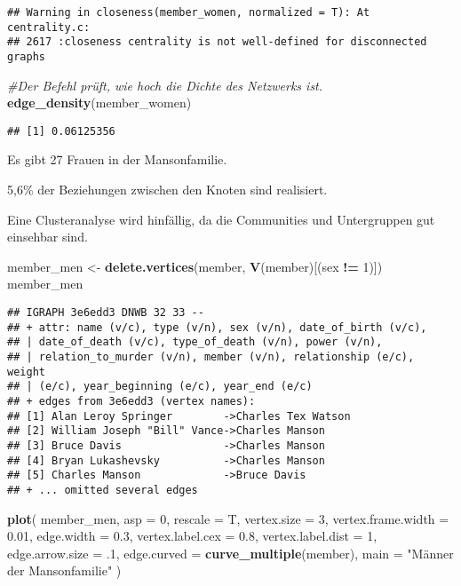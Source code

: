 \documentclass[
]{article}
\newenvironment{Shaded}{\begin{snugshade}}{\end{snugshade}}
\newcommand{\CommentTok}[1]{\textcolor[rgb]{0.56,0.35,0.01}{\textit{#1}}}
\newcommand{\DataTypeTok}[1]{\textcolor[rgb]{0.13,0.29,0.53}{#1}}
\newcommand{\DecValTok}[1]{\textcolor[rgb]{0.00,0.00,0.81}{#1}}
\newcommand{\FloatTok}[1]{\textcolor[rgb]{0.00,0.00,0.81}{#1}}
\newcommand{\KeywordTok}[1]{\textcolor[rgb]{0.13,0.29,0.53}{\textbf{#1}}}
\newcommand{\NormalTok}[1]{#1}
\newcommand{\OperatorTok}[1]{\textcolor[rgb]{0.81,0.36,0.00}{\textbf{#1}}}
\newcommand{\StringTok}[1]{\textcolor[rgb]{0.31,0.60,0.02}{#1}}
\begin{document}
\begin{verbatim}
## Warning in closeness(member_women, normalized = T): At centrality.c:
## 2617 :closeness centrality is not well-defined for disconnected graphs
\end{verbatim}

\begin{Shaded}
\begin{Highlighting}[]
\CommentTok{#Der Befehl prüft, wie hoch die Dichte des Netzwerks ist.}
\KeywordTok{edge_density}\NormalTok{(member_women)}
\end{Highlighting}
\end{Shaded}

\begin{verbatim}
## [1] 0.06125356
\end{verbatim}

Es gibt 27 Frauen in der Mansonfamilie.

5,6\% der Beziehungen zwischen den Knoten sind realisiert.

Eine Clusteranalyse wird hinfällig, da die Communities und Untergruppen
gut einsehbar sind.

\begin{Shaded}
\begin{Highlighting}[]
\NormalTok{member_men <-}\StringTok{ }\KeywordTok{delete.vertices}\NormalTok{(member, }\KeywordTok{V}\NormalTok{(member)[(sex }\OperatorTok{!=}\StringTok{ }\DecValTok{1}\NormalTok{)])}
\NormalTok{member_men}
\end{Highlighting}
\end{Shaded}

\begin{verbatim}
## IGRAPH 3e6edd3 DNWB 32 33 -- 
## + attr: name (v/c), type (v/n), sex (v/n), date_of_birth (v/c),
## | date_of_death (v/c), type_of_death (v/n), power (v/n),
## | relation_to_murder (v/n), member (v/n), relationship (e/c), weight
## | (e/c), year_beginning (e/c), year_end (e/c)
## + edges from 3e6edd3 (vertex names):
## [1] Alan Leroy Springer        ->Charles Tex Watson
## [2] William Joseph "Bill" Vance->Charles Manson    
## [3] Bruce Davis                ->Charles Manson    
## [4] Bryan Lukashevsky          ->Charles Manson    
## [5] Charles Manson             ->Bruce Davis       
## + ... omitted several edges
\end{verbatim}

\begin{Shaded}
\begin{Highlighting}[]
\KeywordTok{plot}\NormalTok{(}
\NormalTok{  member_men,}
  \DataTypeTok{asp =} \DecValTok{0}\NormalTok{,}
  \DataTypeTok{rescale =}\NormalTok{ T,}
  \DataTypeTok{vertex.size =} \DecValTok{3}\NormalTok{,}
  \DataTypeTok{vertex.frame.width =} \FloatTok{0.01}\NormalTok{,}
  \DataTypeTok{edge.width =} \FloatTok{0.3}\NormalTok{,}
  \DataTypeTok{vertex.label.cex =} \FloatTok{0.8}\NormalTok{,}
  \DataTypeTok{vertex.label.dist =} \DecValTok{1}\NormalTok{,}
  \DataTypeTok{edge.arrow.size =} \FloatTok{.1}\NormalTok{,}
  \DataTypeTok{edge.curved =} \KeywordTok{curve_multiple}\NormalTok{(member),}
  \DataTypeTok{main =} \StringTok{"Männer der Mansonfamilie"}
\NormalTok{)}
\end{Highlighting}
\end{Shaded}
\end{document}
